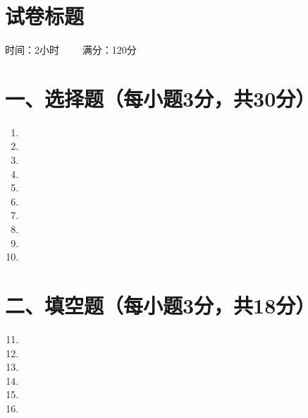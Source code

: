 \documentclass[10pt]{article}
\begin{document}
\section*{\centering 试卷标题}
\centerline{时间：2小时 \ \ \ \ 满分：120分}
\section*{\normalsize 一、选择题（每小题3分，共30分）}
\begin{enumerate}\setcounter{enumi}{0}
    \item %
    \item %
    \item %
    \item %
    \item %
    \item %
    \item %
    \item %
    \item %
    \item %
\end{enumerate}
\section*{\normalsize 二、填空题（每小题3分，共18分）}
\begin{enumerate}\setcounter{enumi}{10}
    \item %
    \item %
    \item %
    \item %
    \item %
    \item %
\end{enumerate}
\end{document}
